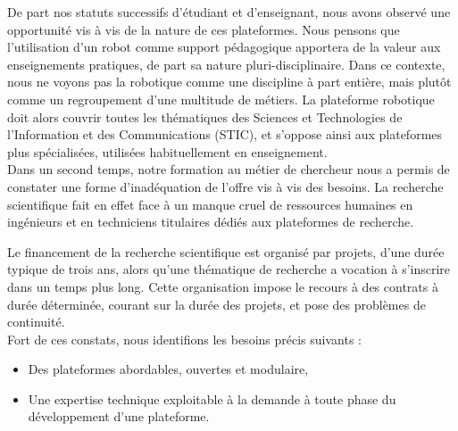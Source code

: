 \documentclass[a4paper,12pt]{report}
\begin{document}
De part nos statuts successifs d'étudiant et d'enseignant, nous avons observé une opportunité vis à vis de la nature de ces plateformes.
Nous pensons que l'utilisation d'un robot comme support pédagogique apportera de la valeur aux enseignements pratiques, de part sa nature pluri-disciplinaire.
Dans ce contexte, nous ne voyons pas la robotique comme une discipline à part entière, mais plutôt comme un regroupement d'une multitude de métiers.
La plateforme robotique doit alors couvrir toutes les thématiques des Sciences et Technologies de l'Information et des Communications (STIC),
et s'oppose ainsi aux plateformes plus spécialisées, utilisées habituellement en enseignement.\\

Dans un second temps, notre formation au métier de chercheur nous a permis de constater une forme d'inadéquation de l'offre vis à vis des besoins.
La recherche scientifique fait en effet face à un manque cruel de ressources humaines en ingénieurs et en techniciens titulaires dédiés aux plateformes de recherche.

Le financement de la recherche scientifique est organisé par projets, d'une durée typique de trois ans, alors qu'une thématique de recherche a vocation à s'inscrire dans un temps plus long.
Cette organisation impose le recours à des contrats à durée déterminée, courant sur la durée des projets, et pose des problèmes de continuité.\\

Fort de ces constats, nous identifions les besoins précis suivants :
\begin{itemize}
	\item Des plateformes abordables, ouvertes et modulaire,
	\item Une expertise technique exploitable à la demande à toute phase du développement d'une plateforme.
\end{itemize}
\end{document}
